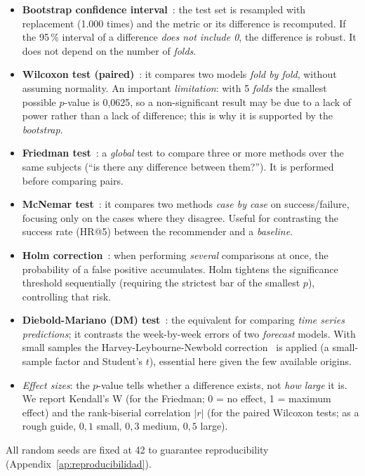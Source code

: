 \begin{itemize}
    \item \textbf{Bootstrap confidence interval}~\cite{efron1979}: the test set is resampled with replacement (1.000 times) and the metric or its difference is recomputed. If the 95\,\% interval of a difference \emph{does not include 0}, the difference is robust. It does not depend on the number of \emph{folds}.
    \item \textbf{Wilcoxon test (paired)}~\cite{wilcoxon1945}: it compares two models \emph{fold by fold}, without assuming normality. An important \emph{limitation}: with 5 \emph{folds} the smallest possible $p$-value is 0,0625, so a non-significant result may be due to a lack of power rather than a lack of difference; this is why it is supported by the \textit{bootstrap}.
    \item \textbf{Friedman test}~\cite{friedman1937}: a \emph{global} test to compare three or more methods over the same subjects (``is there any difference between them?''). It is performed before comparing pairs.
    \item \textbf{McNemar test}~\cite{mcnemar1947}: it compares two methods \emph{case by case} on success/failure, focusing only on the cases where they disagree. Useful for contrasting the success rate (HR@5) between the recommender and a \textit{baseline}.
    \item \textbf{Holm correction}~\cite{holm1979}: when performing \emph{several} comparisons at once, the probability of a false positive accumulates. Holm tightens the significance threshold sequentially (requiring the strictest bar of the smallest $p$), controlling that risk.
    \item \textbf{Diebold-Mariano (DM) test}~\cite{diebold1995}: the equivalent for comparing \emph{time series predictions}; it contrasts the week-by-week errors of two \textit{forecast} models. With small samples the Harvey-Leybourne-Newbold correction~\cite{harvey1997} is applied (a small-sample factor and Student's $t$), essential here given the few available origins.
    \item \emph{Effect sizes}: the $p$-value tells whether a difference exists, not \emph{how large} it is. We report Kendall's W (for the Friedman; 0 = no effect, 1 = maximum effect) and the rank-biserial correlation $|r|$ (for the paired Wilcoxon tests; as a rough guide, $0{,}1$ small, $0{,}3$ medium, $0{,}5$ large).
\end{itemize}

All random seeds are fixed at 42 to guarantee reproducibility (Appendix~\ref{ap:reproducibilidad}).
